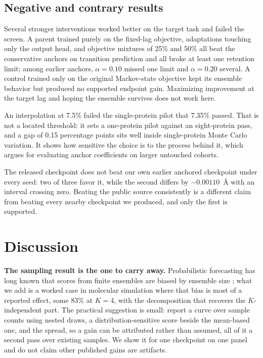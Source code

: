 \documentclass{article}
\begin{document}
\subsection{Negative and contrary results}
\label{sec:negative}

Several stronger interventions worked better on the target task and failed the screen. A parent trained purely on the fixed-lag objective, adaptations touching only the output head, and objective mixtures of 25\% and 50\% all beat the conservative anchors on transition prediction and all broke at least one retention limit; among earlier anchors, $\alpha=0.10$ missed one limit and $\alpha=0.20$ several. A control trained only on the original Markov-state objective kept its ensemble behavior but produced no supported endpoint gain. Maximizing improvement at the target lag and hoping the ensemble survives does not work here.

An interpolation at 7.5\% failed the single-protein pilot that 7.35\% passed. That is not a located threshold: it sets a one-protein pilot against an eight-protein pass, and a gap of 0.15 percentage points sits well inside single-protein Monte Carlo variation. It shows how sensitive the choice is to the process behind it, which argues for evaluating anchor coefficients on larger untouched cohorts.


The released checkpoint does not beat our own earlier anchored checkpoint under every seed: two of three favor it, while the second differs by $-0.00110$~\AA{} with an interval crossing zero. Beating the public source consistently is a different claim from beating every nearby checkpoint we produced, and only the first is supported.

\section{Discussion}

\textbf{The sampling result is the one to carry away.} Probabilistic forecasting has long known that scores from finite ensembles are biased by ensemble size \citep{ferro2008effect,ferro2014fair}; what we add is a worked case in molecular simulation where that bias is most of a reported effect, some 83\% at $K=4$, with the decomposition that recovers the $K$-independent part. The practical suggestion is small: report a curve over sample counts using nested draws, a distribution-sensitive score beside the mean-based one, and the spread, so a gain can be attributed rather than assumed, all of it a second pass over existing samples. We show it for one checkpoint on one panel and do not claim other published gains are artifacts.
\end{document}
